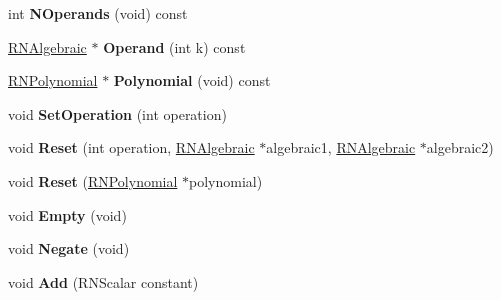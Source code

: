 \begin{DoxyCompactItemize}
\item 
int {\bfseries N\+Operands} (void) const \hypertarget{class_r_n_algebraic_a5eaa7036138dccd463a6792057041f99}{}\label{class_r_n_algebraic_a5eaa7036138dccd463a6792057041f99}

\item 
\hyperlink{class_r_n_algebraic}{R\+N\+Algebraic} $\ast$ {\bfseries Operand} (int k) const \hypertarget{class_r_n_algebraic_ac49ffa12ac9dd491209346cd7eb7ad90}{}\label{class_r_n_algebraic_ac49ffa12ac9dd491209346cd7eb7ad90}

\item 
\hyperlink{class_r_n_polynomial}{R\+N\+Polynomial} $\ast$ {\bfseries Polynomial} (void) const \hypertarget{class_r_n_algebraic_ab3aa29fdeea1d1be8fefecaff6eb1c7f}{}\label{class_r_n_algebraic_ab3aa29fdeea1d1be8fefecaff6eb1c7f}

\item 
void {\bfseries Set\+Operation} (int operation)\hypertarget{class_r_n_algebraic_a91965e91bfc16452e657709de57ffd1f}{}\label{class_r_n_algebraic_a91965e91bfc16452e657709de57ffd1f}

\item 
void {\bfseries Reset} (int operation, \hyperlink{class_r_n_algebraic}{R\+N\+Algebraic} $\ast$algebraic1, \hyperlink{class_r_n_algebraic}{R\+N\+Algebraic} $\ast$algebraic2)\hypertarget{class_r_n_algebraic_a3099596ffeec27cfe916632151444b93}{}\label{class_r_n_algebraic_a3099596ffeec27cfe916632151444b93}

\item 
void {\bfseries Reset} (\hyperlink{class_r_n_polynomial}{R\+N\+Polynomial} $\ast$polynomial)\hypertarget{class_r_n_algebraic_aec545ab7884a6befb0607544e5375401}{}\label{class_r_n_algebraic_aec545ab7884a6befb0607544e5375401}

\item 
void {\bfseries Empty} (void)\hypertarget{class_r_n_algebraic_a844ce3fc0f7ad467d98078aad359cce5}{}\label{class_r_n_algebraic_a844ce3fc0f7ad467d98078aad359cce5}

\item 
void {\bfseries Negate} (void)\hypertarget{class_r_n_algebraic_a23543cc90988131cfe152f37fa616091}{}\label{class_r_n_algebraic_a23543cc90988131cfe152f37fa616091}

\item 
void {\bfseries Add} (R\+N\+Scalar constant)\hypertarget{class_r_n_algebraic_afbbce56d05c186a7b98a6573e9324822}{}\label{class_r_n_algebraic_afbbce56d05c186a7b98a6573e9324822}


\end{DoxyCompactItemize}
